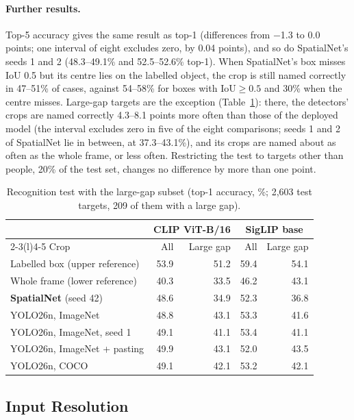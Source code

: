 \paragraph{Further results.} Top-5 accuracy gives the same result as top-1 (differences from $-$1.3 to 0.0 points; one interval of eight excludes zero, by 0.04 points), and so do SpatialNet's seeds 1 and 2 (48.3--49.1\% and 52.5--52.6\% top-1). When SpatialNet's box misses IoU 0.5 but its centre lies on the labelled object, the crop is still named correctly in 47--51\% of cases, against 54--58\% for boxes with IoU${\geq}0.5$ and 30\% when the centre misses. Large-gap targets are the exception (Table~\ref{tab:recog-full}): there, the detectors' crops are named correctly 4.3--8.1 points more often than those of the deployed model (the interval excludes zero in five of the eight comparisons; seeds 1 and 2 of SpatialNet lie in between, at 37.3--43.1\%), and its crops are named about as often as the whole frame, or less often. Restricting the test to targets other than people, 20\% of the test set, changes no difference by more than one point.

\begin{table}[h]
  \caption{Recognition test with the large-gap subset (top-1 accuracy, \%; 2,603 test targets, 209 of them with a large gap).}
  \label{tab:recog-full}
  \footnotesize
  \begin{tabular}{lrrrr}
    \toprule
    & \multicolumn{2}{c}{CLIP ViT-B/16} & \multicolumn{2}{c}{SigLIP base} \\
    \cmidrule(lr){2-3}\cmidrule(l){4-5}
    Crop & All & Large gap & All & Large gap \\
    \midrule
    Labelled box (upper reference) & 53.9 & 51.2 & 59.4 & 54.1 \\
    Whole frame (lower reference) & 40.3 & 33.5 & 46.2 & 43.1 \\
    \midrule
    \textbf{SpatialNet} (seed 42) & 48.6 & 34.9 & 52.3 & 36.8 \\
    YOLO26n, ImageNet & 48.8 & 43.1 & 53.3 & 41.6 \\
    YOLO26n, ImageNet, seed 1 & 49.1 & 41.1 & 53.4 & 41.1 \\
    YOLO26n, ImageNet + pasting & 49.9 & 43.1 & 52.0 & 43.5 \\
    YOLO26n, COCO & 49.1 & 42.1 & 53.2 & 42.1 \\
    \bottomrule
  \end{tabular}
\end{table}

\subsection{Input Resolution}\label{app:resolution}

